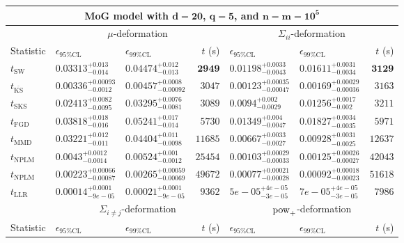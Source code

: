 \begin{tabular}{l|llr|llr}
	\toprule
	\multicolumn{7}{c}{{\bf MoG model with $\mathbf{d=20}$, $\mathbf{q=5}$, and $\mathbf{n=m=10^{5}}$}} \\
	\toprule
	\multicolumn{1}{c}{} & \multicolumn{3}{c}{$\mu$-deformation} & \multicolumn{3}{c}{$\Sigma_{ii}$-deformation} \\
	Statistic & $\epsilon_{95\%\mathrm{CL}}$ & $\epsilon_{99\%\mathrm{CL}}$ & $t$ (s) & $\epsilon_{95\%\mathrm{CL}}$ & $\epsilon_{99\%\mathrm{CL}}$ & $t$ (s) \\
	\midrule
	$t_{\mathrm{SW}}$ & $0.03313_{-0.014}^{+0.013}$ & $0.04474_{-0.013}^{+0.012}$ & ${\mathbf{2949}}$ & $0.01198_{-0.0043}^{+0.0033}$ & $0.01611_{-0.0034}^{+0.0031}$ & ${\mathbf{3129}}$ \\
	$t_{\overline{\mathrm{KS}}}$ & ${\mathbf{0.00336_{-0.0012}^{+0.00093}}}$ & ${\mathbf{0.00457_{-0.00092}^{+0.0008}}}$ & $3047$ & ${\mathbf{0.00123_{-0.00047}^{+0.00035}}}$ & ${\mathbf{0.00169_{-0.00036}^{+0.00029}}}$ & $3163$ \\
	$t_{\mathrm{SKS}}$ & $0.02413_{-0.0095}^{+0.0082}$ & $0.03295_{-0.0081}^{+0.0076}$ & $3089$ & $0.0094_{-0.0029}^{+0.002}$ & $0.01256_{-0.002}^{+0.0017}$ & $3211$ \\
	$t_{\mathrm{FGD}}$ & $0.03818_{-0.016}^{+0.018}$ & $0.05241_{-0.014}^{+0.017}$ & $5730$ & $0.01349_{-0.0047}^{+0.004}$ & $0.01827_{-0.0035}^{+0.0034}$ & $5971$ \\
	$t_{\mathrm{MMD}}$ & $0.03221_{-0.011}^{+0.012}$ & $0.04404_{-0.0098}^{+0.011}$ & $11685$ & $0.00667_{-0.0027}^{+0.0033}$ & $0.00928_{-0.0025}^{+0.0031}$ & $12637$ \\
\rowcolor{red!35}	$t_{\mathrm{NPLM}}$ & $0.0043_{-0.0014}^{+0.0012}$ & $0.00524_{-0.0012}^{+0.001}$ & $25454$ & $0.00103_{-0.00033}^{+0.00029}$ & $0.00125_{-0.00027}^{+0.00026}$ & $42043$ \\
\rowcolor{blue!35}	$t_{\mathrm{NPLM}}$ & $0.00223_{-0.00087}^{+0.00066}$ & $0.00265_{-0.00069}^{+0.00059}$ & $49672$ & $0.00077_{-0.00028}^{+0.00021}$ & $0.00092_{-0.00023}^{+0.00018}$ & $51618$ \\
	$t_{\mathrm{LLR}}$ & $0.00014_{-9e-05}^{+0.0001}$ & $0.00021_{-9e-05}^{+0.0001}$ & $9362$ & $5e-05_{-3e-05}^{+4e-05}$ & $7e-05_{-3e-05}^{+4e-05}$ & $7986$ \\
	\toprule
	\multicolumn{1}{c}{} & \multicolumn{3}{c}{$\Sigma_{i\neq j}$-deformation} & \multicolumn{3}{c}{$\rm{pow}_{+}$-deformation} \\
	Statistic & $\epsilon_{95\%\mathrm{CL}}$ & $\epsilon_{99\%\mathrm{CL}}$ & $t$ (s) & $\epsilon_{95\%\mathrm{CL}}$ & $\epsilon_{99\%\mathrm{CL}}$ & $t$ (s) \\

\end{tabular}
